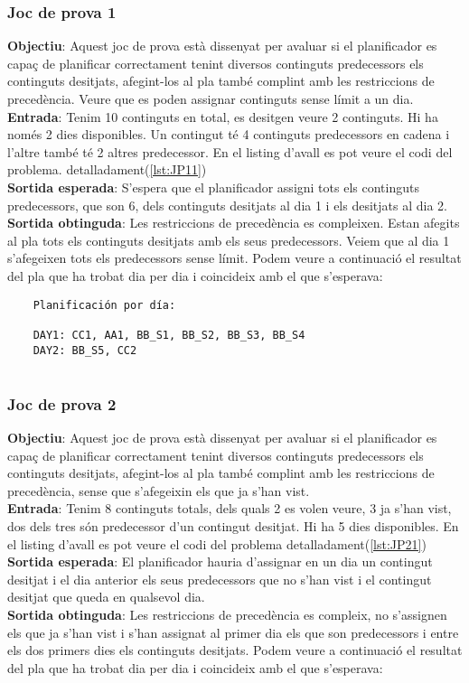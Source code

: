 \documentclass[a4paper]{article}
\begin{document}
	
	\subsubsection{Joc de prova 1}
	\textbf{Objectiu}: Aquest joc de prova està dissenyat per avaluar si el planificador es capaç de planificar correctament tenint diversos continguts predecessors els continguts desitjats, afegint-los al pla també complint amb les restriccions de precedència. Veure que es poden assignar continguts sense límit a un dia. \\
	\textbf{Entrada}: Tenim 10 continguts en total, es desitgen veure 2 continguts. Hi ha només 2 dies disponibles. Un contingut té 4 continguts predecessors en cadena i l'altre també té 2 altres predecessor. En el listing d'avall es pot veure el codi del problema.  detalladament(\ref{lst:JP11})\\
	\textbf{Sortida esperada}: S'espera que el planificador assigni tots els continguts predecessors, que son 6, dels continguts desitjats al dia 1 i els desitjats al dia 2. \\
	\textbf{Sortida obtinguda}:  Les restriccions de  precedència es compleixen.  Estan afegits al pla tots els continguts desitjats amb els seus predecessors. Veiem que al dia 1 s'afegeixen tots els predecessors sense límit. Podem veure a continuació el resultat del pla que ha trobat dia per dia i coincideix amb el que s'esperava:
	
	\begin{verbatim}
	Planificación por día:
	
	DAY1: CC1, AA1, BB_S1, BB_S2, BB_S3, BB_S4
	DAY2: BB_S5, CC2
		
	\end{verbatim}
	
	\subsubsection{Joc de prova 2}
	\textbf{Objectiu}: Aquest joc de prova està dissenyat per avaluar si el planificador es capaç de planificar correctament tenint diversos continguts predecessors els continguts desitjats, afegint-los al pla també complint amb les restriccions de precedència, sense que s'afegeixin els que ja s'han vist. \\
	\textbf{Entrada}: Tenim 8 continguts totals, dels quals 2 es volen veure, 3 ja s'han vist, dos dels tres són predecessor d'un contingut desitjat. Hi ha 5 dies disponibles. En el listing d'avall es pot veure el codi del problema detalladament(\ref{lst:JP21})\\
	\textbf{Sortida esperada}: El planificador hauria d'assignar en un dia un contingut desitjat i el dia anterior els seus predecessors que no s'han vist i el contingut desitjat que queda en qualsevol dia. \\
	\textbf{Sortida obtinguda}: Les restriccions de 
	precedència es compleix, no s'assignen els que ja s'han vist i s'han assignat al primer dia els que son predecessors i entre els dos primers dies els continguts desitjats. Podem veure a continuació el resultat del pla que ha trobat dia per dia i coincideix amb el que s'esperava:
	
\end{document}
